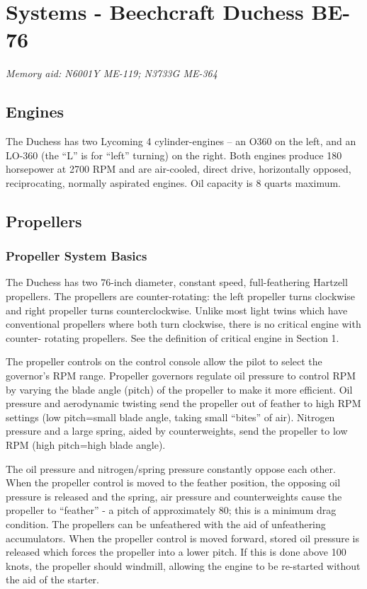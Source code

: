 
\chapter{Systems - Beechcraft Duchess BE-76}

\emph{Memory aid: N6001Y ME-119; N3733G ME-364}

\section{Engines}

The Duchess has two Lycoming 4 cylinder-engines – an O360 on the left, and an LO-360 (the ``L'' is for ``left'' turning) on the right. Both engines produce 180 horsepower at 2700 RPM and are air-cooled, direct drive,
horizontally opposed, reciprocating, normally aspirated engines. Oil capacity is 8 quarts maximum.

\section{Propellers}

\subsection{Propeller System Basics}

The Duchess has two 76-inch diameter, constant speed, full-feathering Hartzell propellers. The propellers are
counter-rotating: the left propeller turns clockwise and right propeller turns counterclockwise. Unlike most light
twins which have conventional propellers where both turn clockwise, there is no critical engine with counter-
rotating propellers. See the definition of critical engine in Section 1.

The propeller controls on the control console allow the pilot to select the governor's RPM range. Propeller governors
regulate oil pressure to control RPM by varying the blade angle (pitch) of the propeller to make it more efficient.
Oil pressure and aerodynamic twisting send the propeller out of feather to high RPM settings (low pitch=small blade
angle, taking small ``bites'' of air). Nitrogen pressure and a large spring, aided by counterweights, send the propeller
to low RPM (high pitch=high blade angle).

The oil pressure and nitrogen/spring pressure constantly oppose each other. When the propeller control is moved to
the feather position, the opposing oil pressure is released and the spring, air pressure and counterweights cause the
propeller to ``feather'' - a pitch of approximately 80\degree; this is a minimum drag condition. The propellers can be
unfeathered with the aid of unfeathering accumulators. When the propeller control is moved forward, stored oil
pressure is released which forces the propeller into a lower pitch. If this is done above 100 knots, the propeller
should windmill, allowing the engine to be re-started without the aid of the starter.

